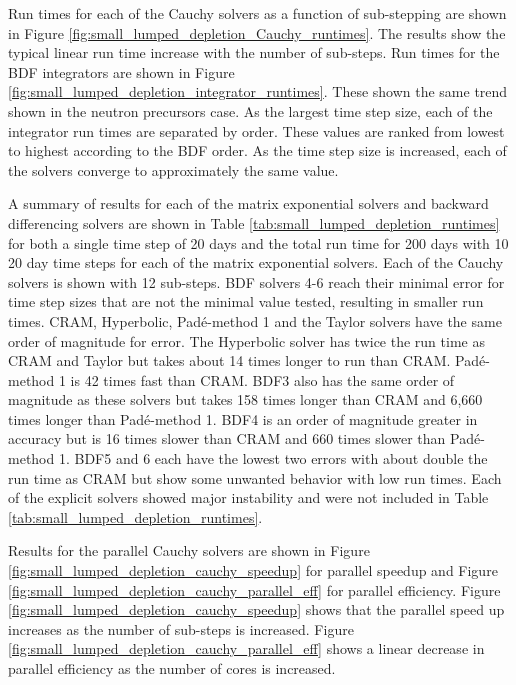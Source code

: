 \clearpage


Run times for each of the Cauchy solvers as a function of sub-stepping are shown in Figure \ref{fig:small_lumped_depletion_Cauchy_runtimes}. The results show the typical linear run time increase with the number of sub-steps. Run times for the BDF integrators are shown in Figure \ref{fig:small_lumped_depletion_integrator_runtimes}. These shown the same trend shown in the neutron precursors case. As the largest time step size, each of the integrator run times are separated by order. These values are ranked from lowest to highest according to the BDF order. As the time step size is increased, each of the solvers converge to approximately the same value.  

A summary of results for each of the matrix exponential solvers and backward differencing solvers are shown in Table \ref{tab:small_lumped_depletion_runtimes} for both a single time step of 20 days and the total run time for 200 days with 10 20 day time steps for each of the matrix exponential solvers. Each of the Cauchy solvers is shown with 12 sub-steps. BDF solvers 4-6 reach their minimal error for time step sizes that are not the minimal value tested, resulting in smaller run times. CRAM, Hyperbolic, Pad\'e-method 1 and the Taylor solvers have the same order of magnitude for error. The Hyperbolic solver has twice the run time as CRAM and Taylor but takes about 14 times longer to run than CRAM. Pad\'e-method 1 is 42 times fast than CRAM. BDF3 also has the same order of magnitude as these solvers but takes 158 times longer than CRAM and 6,660 times longer than Pad\'e-method 1. BDF4 is an order of magnitude greater in accuracy but is 16 times slower than CRAM and 660 times slower than Pad\'e-method 1. BDF5 and 6 each have the lowest two errors with about double the run time as CRAM but show some unwanted behavior with low run times.  Each of the explicit solvers showed major instability and were not included in Table \ref{tab:small_lumped_depletion_runtimes}. 

Results for the parallel Cauchy solvers are shown in Figure \ref{fig:small_lumped_depletion_cauchy_speedup} for parallel speedup and Figure \ref{fig:small_lumped_depletion_cauchy_parallel_eff} for parallel efficiency. Figure \ref{fig:small_lumped_depletion_cauchy_speedup} shows that the parallel speed up increases as the number of sub-steps is increased. Figure \ref{fig:small_lumped_depletion_cauchy_parallel_eff} shows a linear decrease in parallel efficiency as the number of cores is increased. 



